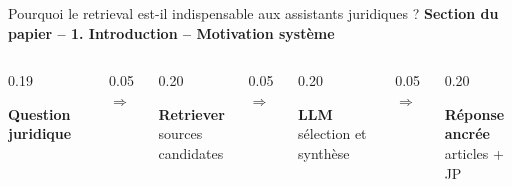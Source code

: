 \documentclass[aspectratio=169,10pt]{beamer}
\newcommand{\papersection}[1]{%
  {\scriptsize\textcolor{accent}{\textbf{Section du papier -- #1}}}\par\vspace{0.55em}}
\begin{document}
\begin{frame}{Pourquoi le retrieval est-il indispensable aux assistants juridiques ?}
  \papersection{1. Introduction -- Motivation système}
  \footnotesize
  \begin{columns}[c,onlytextwidth]
    \begin{column}{0.19\textwidth}\centering
      \colorbox{accentsoft}{\parbox{0.90\linewidth}{\centering\vspace{0.65em}\textbf{Question juridique}\vspace{0.65em}}}
    \end{column}
    \begin{column}{0.05\textwidth}\centering$\Longrightarrow$\end{column}
    \begin{column}{0.20\textwidth}\centering
      \colorbox{accentsoft}{\parbox{0.90\linewidth}{\centering\vspace{0.65em}\textbf{Retriever}\\sources candidates\vspace{0.65em}}}
    \end{column}
    \begin{column}{0.05\textwidth}\centering$\Longrightarrow$\end{column}
    \begin{column}{0.20\textwidth}\centering
      \colorbox{green!10}{\parbox{0.90\linewidth}{\centering\vspace{0.65em}\textbf{LLM}\\sélection et synthèse\vspace{0.65em}}}
    \end{column}
    \begin{column}{0.05\textwidth}\centering$\Longrightarrow$\end{column}
    \begin{column}{0.20\textwidth}\centering
      \colorbox{green!10}{\parbox{0.90\linewidth}{\centering\vspace{0.65em}\textbf{Réponse ancrée}\\articles + JP\vspace{0.65em}}}
    \end{column}
  \end{columns}


\end{frame}
\end{document}
